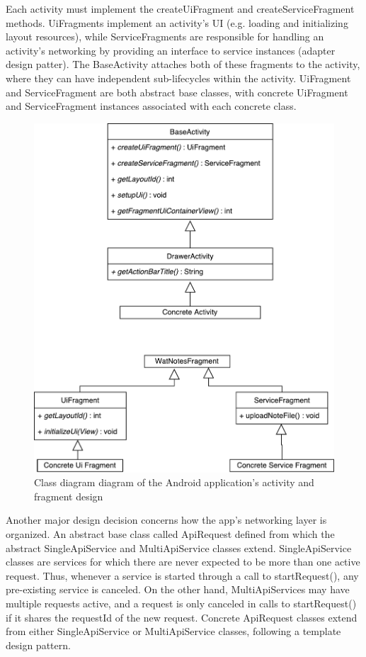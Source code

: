 \documentclass[12pt]{article}
\begin{document}
    Each activity must implement the createUiFragment and createServiceFragment methods. UiFragments implement an activity's UI (e.g. loading and
    initializing layout resources), while ServiceFragments are responsible for handling an activity's networking by providing an interface
    to service instances (adapter design patter). The BaseActivity attaches both of these fragments to the activity, where they can have independent sub-lifecycles
    within the activity. UiFragment and ServiceFragment are both abstract base classes, with concrete UiFragment and ServiceFragment instances associated with each
    concrete class. \\

    \begin{figure}[H]
      \includegraphics[width=\textwidth]{assets/android-activity-class.pdf}
      \caption{Class diagram diagram of the Android application's activity and fragment design}
    \end{figure}

    Another major design decision concerns how the app's networking layer is organized. An abstract base class called ApiRequest defined from which the abstract
    SingleApiService and MultiApiService classes extend. SingleApiService classes are services for which there are never expected to be more than one active request. Thus, whenever
    a service is started through a call to startRequest(), any pre-existing service is canceled. On the other hand, MultiApiServices may have multiple requests active,
    and a request is only canceled in calls to startRequest() if it shares the requestId of the new request. Concrete ApiRequest classes extend from either
    SingleApiService or MultiApiService classes, following a template design pattern. \\
\end{document}
